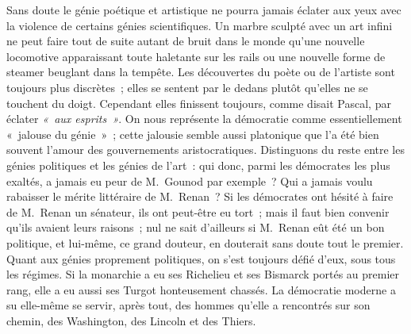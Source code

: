 \documentclass[french,twoside]{book} %
\begin{document}
Sans doute le génie poétique et artistique ne pourra jamais éclater aux yeux avec la violence de certains génies scientifiques. Un marbre sculpté avec un art infini ne peut faire tout de suite autant de bruit dans le monde qu’une nouvelle locomotive apparaissant toute haletante sur les rails ou une nouvelle forme de steamer beuglant dans la tempête. Les découvertes du poète ou de l’artiste sont toujours plus discrètes ; elles se sentent par le dedans plutôt qu’elles ne se touchent du doigt. Cependant elles finissent toujours, comme disait Pascal, par éclater \emph{« aux esprits »}. On nous représente la démocratie comme essentiellement « jalouse du génie » ; cette jalousie semble aussi platonique que l’a été bien souvent l’amour des gouvernements aristocratiques. Distinguons du reste entre les génies politiques et les génies de l’art : qui donc, parmi les démocrates les plus exaltés, a jamais eu peur de M. Gounod par exemple ? Qui a jamais voulu rabaisser le mérite littéraire de M. Renan ? Si les démocrates ont hésité à faire de M. Renan un sénateur, ils ont peut-être eu tort ; mais il faut bien convenir qu’ils avaient leurs raisons ; nul ne sait d’ailleurs si M. Renan eût été un bon politique, et lui-même, ce grand douteur, en douterait sans doute tout le premier. Quant aux génies proprement politiques, on s’est toujours défié d’eux, sous tous les régimes. Si la monarchie a eu ses Richelieu et ses Bismarck portés au premier rang, elle a eu aussi ses Turgot honteusement chassés. La démocratie moderne a su elle-même se servir, après tout, des hommes qu’elle a  rencontrés sur son chemin, des Washington, des Lincoln et des Thiers.\par
\end{document}
